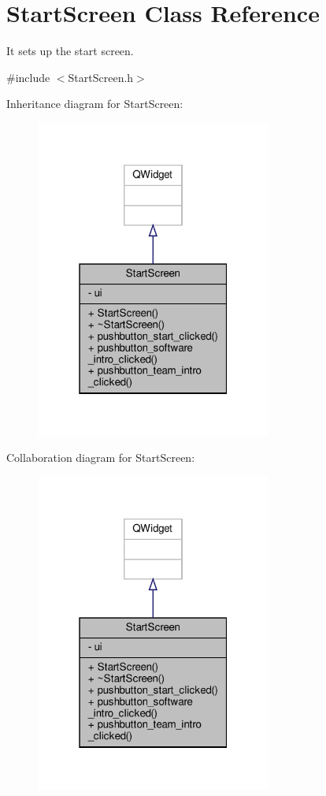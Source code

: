 \hypertarget{class_start_screen}{}\section{Start\+Screen Class Reference}
\label{class_start_screen}


It sets up the start screen.  




{\ttfamily \#include $<$Start\+Screen.\+h$>$}



Inheritance diagram for Start\+Screen\+:
\nopagebreak
\begin{figure}[H]
\begin{center}
\leavevmode
\includegraphics[width=220pt]{class_start_screen__inherit__graph}
\end{center}
\end{figure}


Collaboration diagram for Start\+Screen\+:
\nopagebreak
\begin{figure}[H]
\begin{center}
\leavevmode
\includegraphics[width=220pt]{class_start_screen__coll__graph}
\end{center}
\end{figure}
